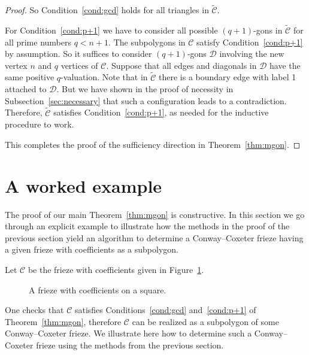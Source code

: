 \documentclass[10pt]{amsart}
\numberwithin{equation}{section}
\theoremstyle{definition}
\theoremstyle{remark}
\begin{document}
\begin{proof}
So Condition~\eqref{cond:gcd} holds for all triangles in 
$\widetilde{\mathcal{C}}$.


For Condition~\eqref{cond:p+1} we have to consider all possible $(q+1)$-gons
in $\widetilde{\mathcal{C}}$ for all prime numbers $q<n+1$. The subpolygons 
in $\mathcal{C}$ satisfy Condition~\eqref{cond:p+1} by assumption. 
So it suffices to consider $(q+1)$-gons $\mathcal{D}$ 
involving the new vertex $n$ and $q$
vertices of $\mathcal{C}$. Suppose that all edges and diagonals in $\mathcal{D}$ 
have the same positive $q$-valuation. Note that in $\widetilde{\mathcal{C}}$ there is a boundary
edge with label 1 attached to $\mathcal{D}$. But 
we have shown in the proof of necessity in
Subsection~\ref{sec:necessary} that such a configuration leads to a contradiction. 
Therefore, $\widetilde{\mathcal{C}}$ satisfies Condition~\eqref{cond:p+1},
as needed for the inductive procedure to work. 

This completes the proof of the sufficiency direction in Theorem~\ref{thm:mgon}.
\end{proof}


\section{A worked example}
\label{sec:example}

The proof of our main Theorem~\ref{thm:mgon} is constructive.
In this section we go through an explicit example
to illustrate how the methods in the proof of the previous section yield
an algorithm to determine a Conway--Coxeter frieze having a given
frieze with coefficients as a subpolygon. 

Let $\mathcal{C}$ be the frieze with coefficients given in Figure~\ref{fig:fwc}.

\begin{figure}[htb]\centering
{}

\vspace*{-2mm}
 \caption{A frieze with coefficients on a square. 
 \label{fig:fwc}}
\end{figure}
One checks that $\mathcal{C}$ satisfies Conditions~\eqref{cond:gcd} and~\eqref{cond:p+1}
of Theorem~\ref{thm:mgon}, therefore $\mathcal{C}$ can be realized as a subpolygon of
some Conway--Coxeter frieze. We illustrate here how to determine such a Conway--Coxeter
frieze using the methods from the previous section.
\end{document}
